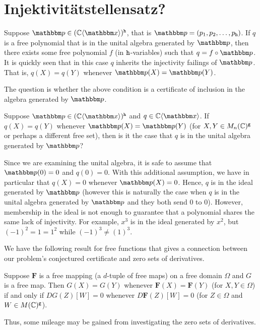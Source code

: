 


\section{Injektivit{\"a}tstellensatz?}

Suppose $\bbp\in (\C\fralg{\bbx})^\tth$, that is $\bbp = (p_1,p_2,\dots, p_\tth)$.
If $q$ is a free polynomial that is in the unital algebra generated by $\bbp$, then there exists some free polynomial $f$ (in 
${\texttt{h}}$-variables) such that $q = f\circ \bbp$.
It is quickly seen that in this case $q$ inherits the injectivity failings of $\bbp$.
That is, $q(X) = q(Y)$ whenever $\bbp(X) = \bbp(Y)$.

The question is whether the above condition is a certificate of inclusion in the algebra generated by $\bbp$.

\begin{problem}
	Suppose $\bbp\in (\C\fralg{\bbx})^\tth$ and $q\in \C\fralg{\bbx}$.
	If $q(X) = q(Y)$ whenever $\bbp(X) = \bbp(Y)$ (for $X,Y\in M_n(\mathbb{C})^{\texttt{g}}$ or perhaps a different free set), then is it the case that $q$ 
	is in the unital algebra generated by $\bbp$?
\end{problem}


Since we are examining the unital algebra, it is safe to assume that $\bbp(0) = 0$ and $q(0) = 0$.
With this additional assumption, we have in particular that $q(X) = 0$ whenever $\bbp(X) = 0$.
Hence, $q$ is in the ideal generated by $\bbp$ (however this is naturally the case when $q$ is in the unital algebra generated by $\bbp$ and 
they both send $0$ to $0$).
However, membership in the ideal is not enough to guarantee that a polynomial shares the same lack of injectivity.
For example, $x^3$ is in the ideal generated by $x^2$, but $(-1)^2 = 1 = 1^2$ while $(-1)^3 \neq (1)^3$.


We have the following result for free functions that gives a connection between our problem's conjectured certificate and zero sets of 
derivatives.

\begin{proposition}
	Suppose $\bm{F}$ is a free mapping (a $d$-tuple of free maps) on a free domain $\Omega$ and $G$ is a free map.
	Then $G(X) = G(Y)$ whenever $\bm{F}(X) = \bm{F}(Y)$ (for $X,Y\in \Omega$) if and only if $DG(Z)[W] = 0$ whenever 
	$D\bm{F}(Z)[W] = 0$ (for $Z\in \Omega$ and $W\in M(\mathbb{C})^{\texttt{g}}$).
\end{proposition}

Thus, some mileage may be gained from investigating the zero sets of derivatives.


